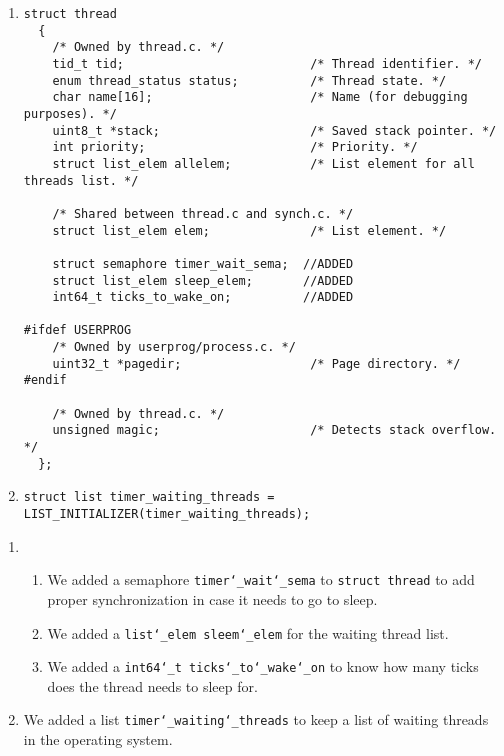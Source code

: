 \documentclass{article}
\renewcommand{\_}{\char`_}
\begin{document}
\begin{enumerate}
 \item \begin{lstlisting}
struct thread
  {
    /* Owned by thread.c. */
    tid_t tid;                          /* Thread identifier. */
    enum thread_status status;          /* Thread state. */
    char name[16];                      /* Name (for debugging purposes). */
    uint8_t *stack;                     /* Saved stack pointer. */
    int priority;                       /* Priority. */
    struct list_elem allelem;           /* List element for all threads list. */

    /* Shared between thread.c and synch.c. */
    struct list_elem elem;              /* List element. */

    struct semaphore timer_wait_sema;  //ADDED
    struct list_elem sleep_elem;       //ADDED 
    int64_t ticks_to_wake_on;          //ADDED 

#ifdef USERPROG
    /* Owned by userprog/process.c. */
    uint32_t *pagedir;                  /* Page directory. */
#endif

    /* Owned by thread.c. */
    unsigned magic;                     /* Detects stack overflow. */
  };
\end{lstlisting}

\item \begin{lstlisting}
struct list timer_waiting_threads = LIST_INITIALIZER(timer_waiting_threads);
\end{lstlisting}

\end{enumerate}

\begin{enumerate}
    \item 
    \begin{enumerate}
        \item We added a semaphore \texttt{timer\char`_wait\char`_sema} to \texttt{struct thread} to add proper synchronization in case it needs to go to sleep.
        \item We added a \texttt{list\char`_elem sleem\char`_elem} for the waiting
        thread list.
        \item We added a \texttt{int64\_t ticks\_to\_wake\_on} to know how many 
        ticks does the thread needs to sleep for.
    \end{enumerate}
    \item We added a list \texttt{timer\_waiting\_threads} to keep a list of waiting
    threads in the operating system.
\end{enumerate}
\end{document}
